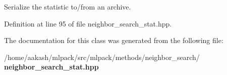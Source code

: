 Serialize the statistic to/from an archive. 



Definition at line 95 of file neighbor\+\_\+search\+\_\+stat.\+hpp.



The documentation for this class was generated from the following file\+:\begin{DoxyCompactItemize}
\item 
/home/aakash/mlpack/src/mlpack/methods/neighbor\+\_\+search/\textbf{ neighbor\+\_\+search\+\_\+stat.\+hpp}\end{DoxyCompactItemize}
